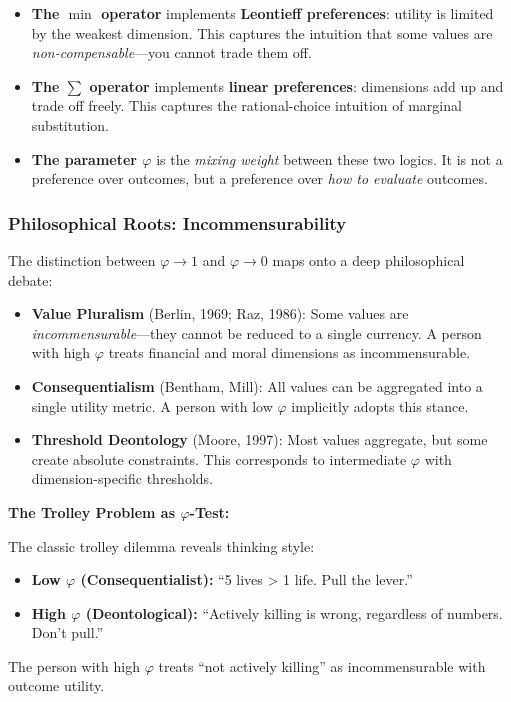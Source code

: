\begin{itemize}
\item \textbf{The $\min$ operator} implements \textbf{Leontieff preferences}: utility is limited by the weakest dimension. This captures the intuition that some values are \textit{non-compensable}—you cannot trade them off.

\item \textbf{The $\sum$ operator} implements \textbf{linear preferences}: dimensions add up and trade off freely. This captures the rational-choice intuition of marginal substitution.

\item \textbf{The parameter $\varphi$} is the \textit{mixing weight} between these two logics. It is not a preference over outcomes, but a preference over \textit{how to evaluate} outcomes.
\end{itemize}

\subsubsection{Philosophical Roots: Incommensurability}

The distinction between $\varphi \to 1$ and $\varphi \to 0$ maps onto a deep philosophical debate:

\begin{itemize}
\item \textbf{Value Pluralism} (Berlin, 1969; Raz, 1986): Some values are \textit{incommensurable}—they cannot be reduced to a single currency. A person with high $\varphi$ treats financial and moral dimensions as incommensurable.

\item \textbf{Consequentialism} (Bentham, Mill): All values can be aggregated into a single utility metric. A person with low $\varphi$ implicitly adopts this stance.

\item \textbf{Threshold Deontology} (Moore, 1997): Most values aggregate, but some create absolute constraints. This corresponds to intermediate $\varphi$ with dimension-specific thresholds.
\end{itemize}

\begin{intuition}
\textbf{The Trolley Problem as $\varphi$-Test:}

The classic trolley dilemma reveals thinking style:
\begin{itemize}
\item \textbf{Low $\varphi$ (Consequentialist):} ``5 lives > 1 life. Pull the lever.''
\item \textbf{High $\varphi$ (Deontological):} ``Actively killing is wrong, regardless of numbers. Don't pull.''
\end{itemize}

The person with high $\varphi$ treats ``not actively killing'' as incommensurable with outcome utility.
\end{intuition}


